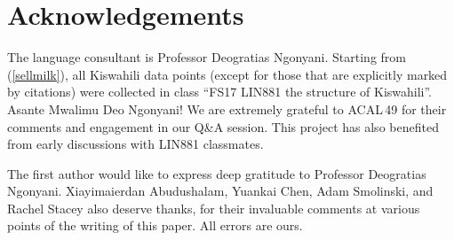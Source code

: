 \documentclass[output=paper]{langscibook}
\begin{document}
\section*{Acknowledgements}
The language consultant is Professor Deogratias Ngonyani. Starting from (\ref{sellmilk}), all Kiswahili data points (except for those that are explicitly marked by citations) were collected in class ``FS17 LIN881 the structure of Kiswahili''. Asante Mwalimu Deo Ngonyani! We are extremely grateful to ACAL\,49 for their comments and engagement in our Q\&A session. This project has also benefited from early discussions with LIN881 classmates.

The first author would like to express deep gratitude to Professor Deogratias Ngonyani. Xiayimaierdan Abudushalam, Yuankai Chen, Adam Smolinski, and Rachel Stacey also deserve thanks, for their invaluable comments at various points of the writing of this paper. All errors are ours. 

{\sloppy\printbibliography[heading=subbibliography,notkeyword=this]}
\end{document}
